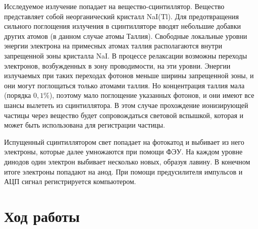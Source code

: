 \documentclass[a4paper, 12pt]{article}
\begin{document}
        Исследуемое излучение попадает на вещество-сцинтиллятор. Вещество представляет собой неорганический кристалл NaI(Tl). Для предотвращения сильного поглощения излучения в сцинтилляторе вводят небольшие добавки других атомов (в данном случае атомы Таллия). Свободные локальные уровни энергии электрона на примесных атомах таллия располагаются внутри запрещенной зоны кристалла NaI.
        В процессе релаксации возможны переходы электронов, возбужденных в зону проводимости, на эти уровни. Энергии излучаемых при таких переходах фотонов меньше ширины запрещенной зоны, и они могут поглощаться только атомами таллия. Но концентрация таллия мала (порядка $0,1\%$), поэтому мало поглощение указанных фотонов, и они имеют все шансы вылететь из сцинтиллятора. В этом случае прохождение ионизирующей частицы через вещество будет сопровождаться световой вспышкой, которая и может быть использована для регистрации частицы.

        Испущенный сцинтиллятором свет попадает на фотокатод и выбивает из него электроны, которые далее умножаются при помощи ФЭУ. На каждом уровне динодов один электрон выбивает несколько новых, образуя лавину. В конечном итоге электроны попадают на анод. При помощи предусилителя импульсов и АЦП сигнал регистрируется компьютером.

    \section{Ход работы}
\end{document}
